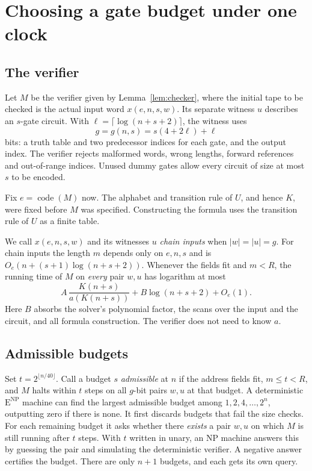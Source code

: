 \documentclass[12pt,letterpaper]{article}
\newcommand{\ENP}{\mathrm{E}^{\mathrm{NP}}}
\begin{document}
\section{Choosing a gate budget under one clock}\label{sec:budget}

\subsection{The verifier}
Let \(M\) be the verifier given by Lemma~\ref{lem:checker}, where the
initial tape to be checked is the actual input word \(x(e,n,s,w)\). Its
separate witness \(u\) describes an \(s\)-gate circuit. With
\(\ell=\lceil\log(n+s+2)\rceil\), the witness uses
\[
          g=g(n,s)=s(4+2\ell)+\ell
\]
bits: a truth table and two predecessor indices for each gate, and the
output index. The verifier rejects malformed words, wrong lengths, forward
references and out-of-range indices. Unused dummy gates allow every circuit
of size at most \(s\) to be encoded.

Fix \(e=\operatorname{code}(M)\) now. The alphabet and transition rule of
\(U\), and hence \(K\), were fixed before \(M\) was specified. Constructing
the formula uses the transition rule of \(U\) as a finite table.

We call \(x(e,n,s,w)\) and its witnesses \(u\) \emph{chain inputs} when
\(|w|=|u|=g\). For chain inputs the length \(m\) depends only on \(e,n,s\)
and is \(O_e(n+(s+1)\log(n+s+2))\). Whenever the fields fit and \(m<R\),
the running time of \(M\) on \emph{every} pair \(w,u\) has logarithm at most
\begin{equation}
     A\,\frac{K(n+s)}{a(K(n+s))}+B\log(n+s+2)+O_e(1) . \label{eq:cost}
\end{equation}
Here \(B\) absorbs the solver's polynomial factor, the scans over the input
and the circuit, and all formula construction. The verifier does not need
to know \(a\).

\subsection{Admissible budgets}
Set \(t=2^{\lfloor n/40\rfloor}\). Call a budget \(s\) \emph{admissible} at
\(n\) if the address fields fit, \(m\le t<R\), and \(M\) halts within
\(t\) steps on all \(g\)-bit pairs \(w,u\) at that budget. A deterministic
\(\ENP\) machine can find the largest admissible budget among
\(1,2,4,\ldots,2^n\), outputting zero if there is none. It first discards
budgets that fail the size checks. For each remaining budget it asks
whether there \emph{exists} a pair \(w,u\) on which \(M\) is still running
after \(t\) steps. With \(t\) written in unary, an NP machine answers this
by guessing the pair and simulating the deterministic verifier. A negative
answer certifies the budget. There are only \(n+1\) budgets, and each gets
its own query.
\end{document}
